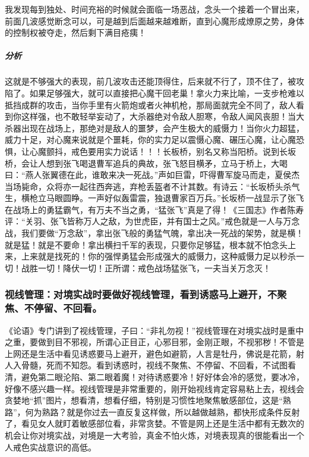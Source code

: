 \begin{case}[做好慎独]
    我发现每到独处、时间充裕的时候就会面临一场恶战，念头一个接着一个冒出来，前面几波感觉断念可以，可是越到后面越来越难断，直到心魔形成燎原之势，身体的控制权被夺走，然后剩下满目疮痍！
    \subparagraph{分析} 这就是不够强大的表现，前几波攻击还能顶得住，后来就不行了，顶不住了，被攻陷了。如果足够强大，就可以直接把心魔干回老巢！拿火力来比喻，一支步枪难以抵挡成群的攻击，当你手里有火箭炮或者火神机枪，那局面就完全不同了，敌人看到你这样强，也不敢轻举妄动了，大杀器绝对令敌人胆寒，令敌人闻风丧胆！当大杀器出现在战场上，那绝对是敌人的噩梦，会产生极大的威慑力！当你火力超猛，威力十足，对心魔来说就是个噩耗，你的实力足以震慑心魔、碾压心魔，让心魔恐惧，让心魔颤抖，戒色要用实力说话！！！长板桥，别名又称当阳桥。说到长坂桥，会让人想到张飞喝退曹军追兵的典故，张飞怒目横矛，立马于桥上，大喝曰：“燕人张翼德在此，谁敢来决一死战。”声如巨雷，吓得曹军旋马而走，夏侯杰当场毙命，众将亦一起往西奔逃，弃枪丢盔者不计其数。有诗云：“长坂桥头杀气生，横枪立马眼圆睁。一声好似轰雷震，独退曹家百万兵。”长坂桥一战显示了张飞在战场上的勇猛霸气，有万夫不当之勇，“猛张飞”真是了得！《三国志》作者陈寿评：“关羽、张飞皆称万人之敌，为世虎臣，并有国士之风。”戒色就是一人与万念战，我们要做“万念敌”，拿出张飞般的勇猛气魄，拿出决一死战的架势，就是横！就是猛！就是不要命！拿出横扫千军的表现，只要你足够猛，根本就不怕念头上来，上来就是找死的！你的强悍勇猛会形成强大的威慑力，这种威慑力足以秒杀一切！战胜一切！降伏一切！正所谓：戒色战场猛张飞，一夫当关万念灭！
\end{case}

\subsubsection{视线管理：对境实战时要做好视线管理，看到诱惑马上避开，不聚焦、不停留、不回看。}

《论语》专门讲到了视线管理，子曰：“非礼勿视！”视线管理在对境实战时是重中之重，要做到目不邪视，所谓心正目正，心邪目邪，金刚正眼，不视邪秽！不管是上网还是生活中看见诱惑要马上避开，避色如避箭，人言是牡丹，佛说是花箭，射人入骨髓，死而不知怨。看到诱惑时，视线不聚焦、不停留、不回看，不试图看清，避免第二眼沦陷、第二眼着魔！对待诱惑要冷！好好体会冷的感觉，要冰冷，好像不感兴趣一样。视线管理是非常重要的，刚开始视线肯定容易粘上去，视线会贪婪地“抓”图片，想看清，想看仔细，特别是习惯性地聚焦敏感部位，这是“熟路”，何为熟路？就是你过去一直反复这样做，所以越做越熟，都快形成条件反射了，看见女人就盯着敏感部位看，非常贪婪。不管是网上还是生活中都有无数次的机会让你对境实战，对境是一大考验，真金不怕火炼，对境表现真的很能看出一个人戒色实战意识的高低。

